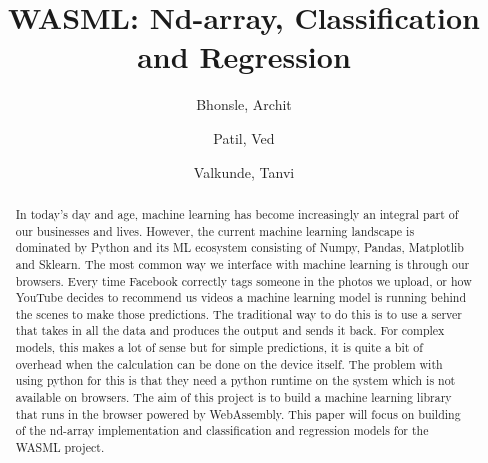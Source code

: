 \documentclass[a4paper,12pt]{report}
\title{WASML: Nd-array, Classification and Regression}
\author{
  Bhonsle, Archit\\
  \and
  Patil, Ved\\
  \and
  Valkunde, Tanvi\\
}
\begin{document}
\maketitle
\tableofcontents

\begin{abstract}
  In today’s day and age, machine learning has become increasingly an
  integral part of our businesses and lives. However, the current machine
  learning landscape is dominated by Python and its ML ecosystem consisting
  of Numpy, Pandas, Matplotlib and Sklearn. The most common way we
  interface with machine learning is through our browsers. Every time
  Facebook correctly tags someone in the photos we upload, or how YouTube
  decides to recommend us videos a machine learning model is running behind
  the scenes to make those predictions. The traditional way to do this is
  to use a server that takes in all the data and produces the output and
  sends it back. For complex models, this makes a lot of sense but for
  simple predictions, it is quite a bit of overhead when the calculation
  can be done on the device itself. The problem with using python for this
  is that they need a python runtime on the system which is not available
  on browsers. The aim of this project is to build a machine learning
  library that runs in the browser powered by WebAssembly. This paper will
  focus on building of the nd-array implementation and classification and
  regression models for the WASML project.
\end{abstract}
\end{document}
